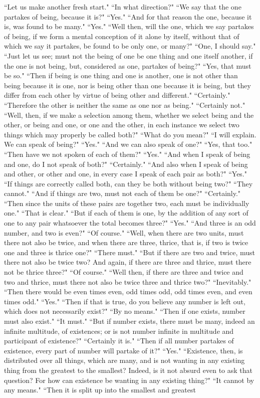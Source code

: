 \documentclass[letterpaper,12pt]{article}
\newcommand{\stephpag}[1]{\marginnote{\small\itshape\fontfamily{ppl}\selectfont #1}}
\begin{document}
``Let us make another fresh start." ``In what direction?" ``We say that the one partakes of being, because it is?" ``Yes." ``And for that reason the one, because it is, was found to be many." ``Yes." ``Well then, will the one, which we say partakes of being, if we form a mental conception of it alone by itself, without that of which we say it partakes, be found to be only one, or many?" ``One, I should say." \stephpag{b} ``Just let us see; must not the being of one be one thing and one itself another, if the one is not being, but, considered as one, partakes of being?" ``Yes, that must be so." ``Then if being is one thing and one is another, one is not other than being because it is one, nor is being other than one because it is being, but they differ from each other by virtue of being other and different." ``Certainly." ``Therefore the other is neither the same as one nor as being." ``Certainly not." ``Well, then, if we make a selection among them, \stephpag{c} whether we select being and the other, or being and one, or one and the other, in each instance we select two things which may properly be called both?" ``What do you mean?" ``I will explain. We can speak of being?" ``Yes." ``And we can also speak of one?" ``Yes, that too." ``Then have we not spoken of each of them?" ``Yes." ``And when I speak of being and one, do I not speak of both?" ``Certainly." ``And also when I speak of being and other, or other and one, in every case I speak of each pair as both?" \stephpag{d} ``Yes." ``If things are correctly called both, can they be both without being two?" ``They cannot." ``And if things are two, must not each of them be one?" ``Certainly." ``Then since the units of these pairs are together two, each must be individually one." ``That is clear." ``But if each of them is one, by the addition of any sort of one to any pair whatsoever the total becomes three?" ``Yes." ``And three is an odd number, and two is even?" ``Of course." \stephpag{e} ``Well, when there are two units, must there not also be twice, and when there are three, thrice, that is, if two is twice one and three is thrice one?" ``There must." ``But if there are two and twice, must there not also be twice two? And again, if there are three and thrice, must there not be thrice three?" ``Of course." ``Well then, if there are three and twice and two and thrice, must there not also be twice three and thrice two?" ``Inevitably." ``Then there would be even times even, \stephpag{144 a} odd times odd, odd times even, and even times odd." ``Yes." ``Then if that is true, do you believe any number is left out, which does not necessarily exist?" ``By no means." ``Then if one exists, number must also exist." ``It must." ``But if number exists, there must be many, indeed an infinite multitude, of existences; or is not number infinite in multitude and participant of existence?" ``Certainly it is." ``Then if all number partakes of existence, every part of number will partake of it?" ``Yes." \stephpag{b} ``Existence, then, is distributed over all things, which are many, and is not wanting in any existing thing from the greatest to the smallest? Indeed, is it not absurd even to ask that question? For how can existence be wanting in any existing thing?" ``It cannot by any means." ``Then it is split up into the smallest and greatest 
\end{document}
